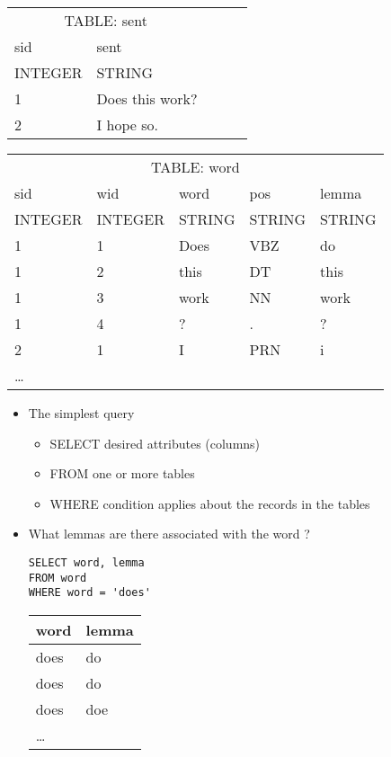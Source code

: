 \documentclass[a4paper,landscape,headrule,footrule,xetex]{foils}
\begin{document}

\begin{tabular}{lllll}
  \multicolumn{2}{c}{TABLE: sent} \\
  sid & sent \\ \hline
  INTEGER & STRING \\ \hline
  1   & Does this work? \\
  2   & I hope so. \\
\end{tabular}


\begin{tabular}{lllll}
  \multicolumn{5}{c}{TABLE: word} \\
  sid & wid & word & pos& lemma \\ \hline
  INTEGER &INTEGER & STRING& STRING & STRING \\ \hline
  1   &  1 & Does & VBZ & do \\
  1   &  2 & this & DT & this \\
  1   &  3 & work & NN & work \\
  1   &  4 & ?    & . & ? \\
  2   &  1 & I & PRN & i \\
  \ldots
\end{tabular}



\begin{itemize} \addtolength{\itemsep}{-1ex}
\item The simplest query
  \begin{itemize}
  \item SELECT desired attributes (columns)
  \item FROM one or more tables
  \item WHERE condition applies about the records  in the tables
  \end{itemize}
\item What lemmas are there associated with the word ?
\begin{verbatim}
SELECT word, lemma
FROM word
WHERE word = 'does'
\end{verbatim}

  \begin{tabular}{ll}
    \textbf{word} & \textbf{lemma} \\ \hline
    does & do \\
    does & do \\
    does & doe \\
    \ldots
  \end{tabular}
\end{itemize}
\end{document}
